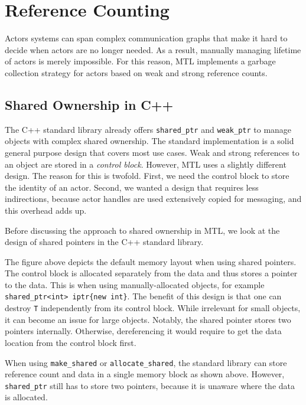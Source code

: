 \section{Reference Counting}
\label{reference-counting}

Actors systems can span complex communication graphs that make it hard to
decide when actors are no longer needed. As a result, manually managing
lifetime of actors is merely impossible. For this reason, MTL implements a
garbage collection strategy for actors based on weak and strong reference
counts.

\subsection{Shared Ownership in C++}

The C++ standard library already offers \lstinline^shared_ptr^ and
\lstinline^weak_ptr^ to manage objects with complex shared ownership. The
standard implementation is a solid general purpose design that covers most use
cases. Weak and strong references to an object are stored in a \emph{control
block}. However, MTL uses a slightly different design. The reason for this is
twofold. First, we need the control block to store the identity of an actor.
Second, we wanted a design that requires less indirections, because actor
handles are used extensively copied for messaging, and this overhead adds up.

Before discussing the approach to shared ownership in MTL, we look at the
design of shared pointers in the C++ standard library.


The figure above depicts the default memory layout when using shared pointers.
The control block is allocated separately from the data and thus stores a
pointer to the data. This is when using manually-allocated objects, for example
\lstinline^shared_ptr<int> iptr{new int}^. The benefit of this design is that
one can destroy \lstinline^T^ independently from its control block. While
irrelevant for small objects, it can become an issue for large objects.
Notably, the shared pointer stores two pointers internally. Otherwise,
dereferencing it would require to get the data location from the control block
first.


When using \lstinline^make_shared^ or \lstinline^allocate_shared^, the standard
library can store reference count and data in a single memory block as shown
above. However, \lstinline^shared_ptr^ still has to store two pointers, because
it is unaware where the data is allocated.

